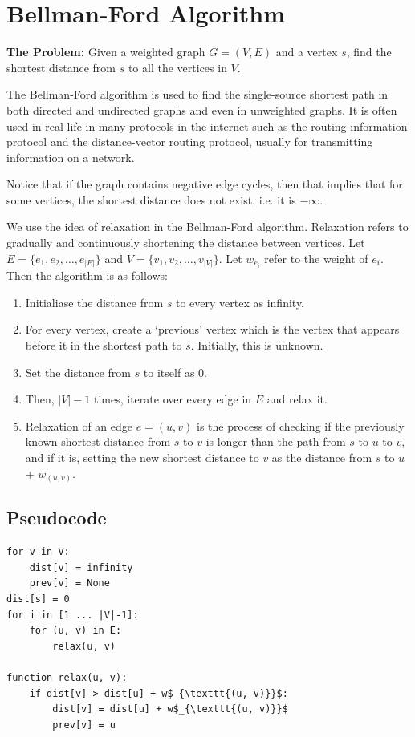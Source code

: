 \documentclass[12pt, a4paper]{article}
\theoremstyle{definition}
\theoremstyle{remark}
\begin{document}
\section{Bellman-Ford Algorithm}
\begin{tcolorbox}
    \textbf{The Problem:} Given a weighted graph $G=(V,E)$ and a vertex $s$, find the shortest distance from $s$ to all the vertices in $V$.
\end{tcolorbox}

The Bellman-Ford algorithm is used to find the single-source shortest path in both directed and undirected graphs and even in unweighted graphs. It is often used in real life in many protocols in the internet such as the routing information protocol and the distance-vector routing protocol, usually for transmitting information on a network.

Notice that if the graph contains negative edge cycles, then that implies that for some vertices, the shortest distance does not exist, i.e. it is $-\infty$.

We use the idea of relaxation in the Bellman-Ford algorithm. Relaxation refers to gradually and continuously shortening the distance between vertices.
Let $E = \{e_1, e_2, \ldots, e_{|E|}\}$ and $V = \{v_1, v_2,\ldots, v_{|V|}\}$. Let $w_{e_i}$ refer to the weight of $e_i$.
Then the algorithm is as follows:
\begin{enumerate}
    \item Initialiase the distance from $s$ to every vertex as infinity.
    \item For every vertex, create a `previous' vertex which is the vertex that appears before it in the shortest path to $s$. Initially, this is unknown.
    \item Set the distance from $s$ to itself as 0.
    \item Then, $|V|-1$ times, iterate over every edge in $E$ and relax it.
    \item Relaxation of an edge $e = (u, v)$ is the process of checking if the previously known shortest distance from $s$ to $v$ is longer than the path from $s$ to $u$ to $v$, and if it is, setting the new shortest distance to $v$ as the distance from $s$ to $u$ + $w_{(u, v)}$.
\end{enumerate}

\subsection{Pseudocode}
\begin{lstlisting}[mathescape=true]
for v in V:
    dist[v] = infinity
    prev[v] = None
dist[s] = 0
for i in [1 ... |V|-1]:
    for (u, v) in E:
        relax(u, v)

function relax(u, v):
    if dist[v] > dist[u] + w$_{\texttt{(u, v)}}$:
        dist[v] = dist[u] + w$_{\texttt{(u, v)}}$
        prev[v] = u
\end{lstlisting}
\end{document}

